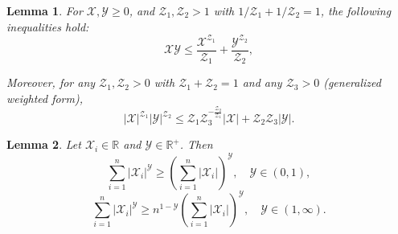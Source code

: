\documentclass[pdflatex,sn-mathphys-num]{sn-jnl}%
\theoremstyle{thmstyleone}%
\newtheorem{lemma}{Lemma}
\theoremstyle{thmstyletwo}%
\theoremstyle{thmstylethree}%
\begin{document}
\begin{lemma}	\label{lemma:2} \cite{TeeEtAl_2009_Barrierlyapunova} For $\mathcal{X}, \mathcal{Y}  \geq 0$, and $ \mathcal{Z}_1 ,  \mathcal{Z}_2> 1$ with ${1}/{ \mathcal{Z}_1} + {1}/{ \mathcal{Z}_2} = 1$, the following inequalities hold:
	\begin{equation}\label{eq:9}
		\mathcal{X} \mathcal{Y}  \leq \frac{\mathcal{X}^{ \mathcal{Z}_1}}{ \mathcal{Z}_1} + \frac{\mathcal{Y} ^{ \mathcal{Z}_2}}{ \mathcal{Z}_2},
	\end{equation}
	 
	Moreover, for any $\mathcal{Z}_{1},\mathcal{Z}_{2}>0$ with $\mathcal{Z}_{1}+\mathcal{Z}_{2}=1$ and any $\mathcal{Z}_{3}>0$ (generalized weighted form),
	\begin{equation}\label{eq:10}
		|\mathcal{X}|^{ \mathcal{Z}_{1}}|\mathcal{Y} |^{ \mathcal{Z}_{2}}\leq  \mathcal{Z}_{1} \mathcal{Z}_{3}^{-\frac{ \mathcal{Z}_{2}}{ \mathcal{Z}_{1}}}|\mathcal{X}|+ \mathcal{Z}_{2}  \mathcal{Z}_{3}|\mathcal{Y} |.
	\end{equation} 
\end{lemma}  

\begin{lemma} \label{lemma:3}\cite{HardyLittlewoodPolya_1952_Inequalities} Let $\mathcal{X}_i\in\mathbb{R}$ and $\mathcal{Y}\in\mathbb{R}^+$. Then
	\begin{equation}\label{eq:11}
		\sum_{i=1}^{n}|\mathcal{X}_i|^{\mathcal{Y} } \geq \left(\sum_{i=1}^{n}|\mathcal{X}_i|\right)^{\mathcal{Y} }, \quad \mathcal{Y}  \in (0,1) ,
	\end{equation}
	\begin{equation}\label{eq:12}
		\sum_{i=1}^{n}|\mathcal{X}_i|^{\mathcal{Y} } \geq n^{1-\mathcal{Y} }\left(\sum_{i=1}^{n}|\mathcal{X}_i|\right)^{\mathcal{Y} }, \quad \mathcal{Y}  \in (1,\infty) .
	\end{equation}
\end{lemma}
\end{document}
